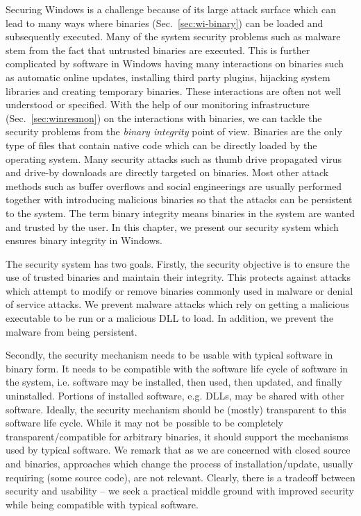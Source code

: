 
Securing Windows is a challenge because of its large
attack surface which can lead to many ways where
binaries (Sec.~\ref{sec:wi-binary}) can be loaded and subsequently executed.
Many of the system security problems such as malware
stem from the fact that untrusted binaries are executed.
This is further complicated by
software in Windows having many interactions on binaries such as
automatic online updates, installing third party plugins,
hijacking system libraries and creating temporary binaries.
These interactions are often not well understood or specified.
With the help of our monitoring infrastructure (Sec.~\ref{sec:winresmon})
on the interactions with binaries,
we can tackle the security problems from the {\em binary integrity}
point of view.
Binaries are the only type of files that contain native code which
can be directly loaded by the operating system.
Many security attacks such as thumb drive propagated virus and
drive-by downloads are directly targeted on binaries.
Most other attack methods such as buffer overflows and social engineerings
are usually performed together with introducing malicious binaries
so that the attacks can be persistent to the system.
The term binary integrity means binaries in the system are
wanted and trusted by the user.
In this chapter, we present our security system which ensures
binary integrity in Windows.

The security system has two goals. Firstly, the security objective
is to ensure the use of trusted binaries and maintain their integrity.
This protects against attacks which attempt to modify or remove binaries
commonly used in malware or denial of service attacks.
We prevent malware attacks which rely on
getting a malicious executable to be run or
a malicious DLL to load.
In addition, we prevent the malware from being persistent.

Secondly, the security mechanism needs to be usable with typical
software in binary form.
It needs to be compatible with the software life cycle of software in the
system, i.e.
software may be installed, then used, then updated, and 
finally uninstalled. 
Portions of installed software, e.g. DLLs,
may be shared with other software. 
Ideally, the security mechanism should be (mostly) transparent to 
this software life cycle.
While it may not be possible to be completely transparent/compatible 
for arbitrary binaries, it should support the mechanisms used 
by typical software.
We remark that as we are concerned with
closed source and binaries,
approaches which change the process of installation/update,
usually requiring (some source code), are not relevant.
Clearly, there is a tradeoff between security and usability --
we seek a practical middle ground with improved security while
being compatible with typical software.


